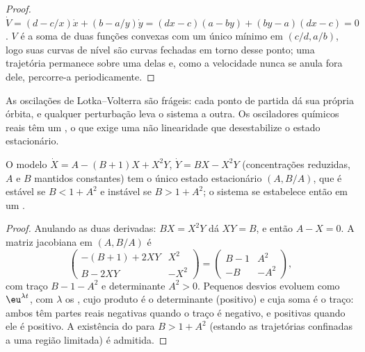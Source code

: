 \begin{proof}
$\dot V = (d - c/x)\dot x + (b - a/y)\dot y = (dx - c)(a - by) + (by - a)(dx - c) = 0$. $V$ é a
soma de duas funções convexas com um único mínimo em $(c/d, a/b)$, logo suas curvas
de nível são curvas fechadas em torno desse ponto; uma trajetória permanece sobre
uma delas e, como a velocidade nunca se anula fora dele, percorre-a periodicamente.
\end{proof}

As oscilações de Lotka--Volterra são frágeis: cada ponto de partida dá sua própria
órbita, e qualquer perturbação leva o sistema a outra. Os osciladores químicos
reais têm um , o que exige uma não linearidade que desestabilize o
estado estacionário.

\begin{proposition}\label{prop:b3:complex-kinetics:hopf}
O modelo $\dot X = A - (B + 1)X + X^2Y$, $\dot Y = BX - X^2Y$ (concentrações reduzidas,
$A$ e $B$ mantidos constantes) tem o único estado estacionário $(A, B/A)$, que é
estável se $B < 1 + A^2$ e instável se $B > 1 + A^2$; o sistema se estabelece então em
um .
\end{proposition}

\begin{proof}
Anulando as duas derivadas: $BX = X^2Y$ dá $XY = B$, e então $A - X = 0$. A
matriz jacobiana em $(A, B/A)$ é
\[
  \begin{pmatrix} -(B + 1) + 2XY & X^2 \\ B - 2XY & -X^2 \end{pmatrix}
  = \begin{pmatrix} B - 1 & A^2 \\ -B & -A^2 \end{pmatrix},
\]
com traço $B - 1 - A^2$ e determinante $A^2 > 0$. Pequenos desvios evoluem como
$\eu^{\lambda t}$, com $\lambda$ os , cujo produto é o determinante (positivo)
e cuja soma é o traço: ambos têm partes reais negativas quando o traço é
negativo, e positivas quando ele é positivo. A existência do 
para $B > 1 + A^2$ (estando as trajetórias confinadas a uma região limitada) é
admitida.
\end{proof}

